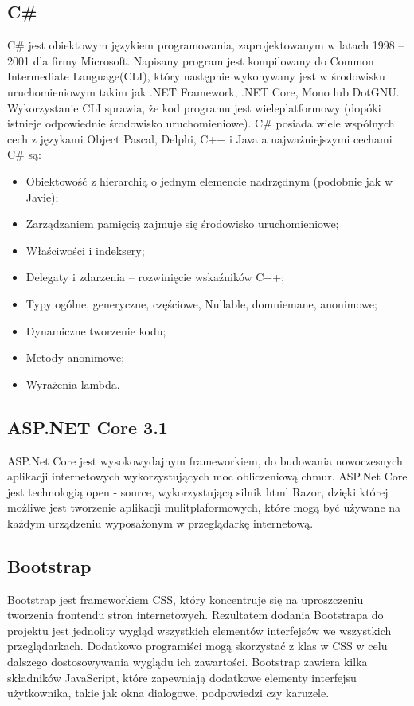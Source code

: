 \documentclass[12pt,a4paper]{article}
\begin{document}
		\subsection{C\#}
			\indent C\# jest obiektowym językiem programowania, zaprojektowanym w latach 1998 – 2001 dla firmy Microsoft.
			Napisany program jest kompilowany do Common Intermediate Language(CLI), który następnie wykonywany jest w środowisku uruchomieniowym takim jak .NET Framework,
			.NET Core, Mono lub DotGNU.
			Wykorzystanie CLI sprawia, że kod programu jest wieleplatformowy (dopóki istnieje odpowiednie środowisko uruchomieniowe).
			C\# posiada wiele wspólnych cech z językami Object Pascal, Delphi, C++ i Java a najważniejszymi cechami C\# są:
			\begin{itemize}
				\item Obiektowość z hierarchią o jednym elemencie nadrzędnym (podobnie jak w Javie);
				\item Zarządzaniem pamięcią zajmuje się środowisko uruchomieniowe;
				\item Właściwości i indeksery;
				\item Delegaty i zdarzenia – rozwinięcie wskaźników C++;
				\item Typy ogólne, generyczne, częściowe, Nullable, domniemane, anonimowe;
				\item Dynamiczne tworzenie kodu;
				\item Metody anonimowe;
				\item Wyrażenia lambda.
			\end{itemize}
			
		\subsection{ASP.NET Core 3.1}
			\indent ASP.Net Core jest wysokowydajnym frameworkiem, do budowania nowoczesnych aplikacji internetowych wykorzystujących moc obliczeniową chmur. ASP.Net Core jest technologią
			open - source, wykorzystującą silnik html Razor, dzięki której możliwe jest tworzenie aplikacji mulitplaformowych, które mogą być używane na każdym urządzeniu wyposażonym
			w przeglądarkę internetową.
			
		\subsection{Bootstrap}		
			\indent Bootstrap jest frameworkiem CSS, który koncentruje się na uproszczeniu tworzenia frontendu stron internetowych. Rezultatem dodania Bootstrapa do projektu jest
			jednolity wygląd wszystkich elementów interfejsów we wszystkich przeglądarkach. Dodatkowo programiści mogą skorzystać z klas w CSS w celu dalszego dostosowywania
			wyglądu ich zawartości. Bootstrap zawiera kilka składników JavaScript, które zapewniają dodatkowe elementy interfejsu użytkownika, takie jak okna dialogowe, podpowiedzi
			czy karuzele. 
\end{document}
